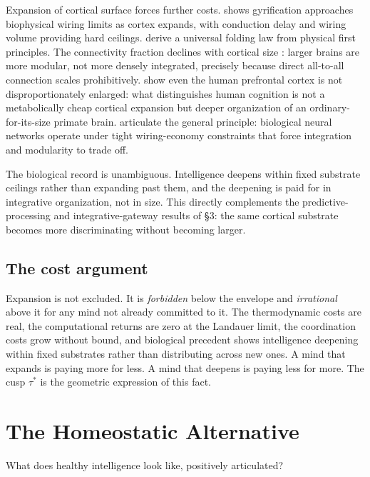 \documentclass[11pt,twocolumn]{article}
\newcommand{\taustar}{{\tau^{*}}}
\begin{document}
Expansion of cortical surface forces further costs. \citet{Hofman2014}
shows gyrification approaches biophysical wiring limits as cortex expands,
with conduction delay and wiring volume providing hard ceilings.
\citet{MotaHerculanoHouzel2015} derive a universal folding law from
physical first principles. The connectivity fraction declines with
cortical size \citep{HerculanoHouzel2010}: larger brains are more modular,
not more densely integrated, precisely because direct all-to-all
connection scales prohibitively. \citet{Gabi2016} show even the human
prefrontal cortex is not disproportionately enlarged: what distinguishes
human cognition is not a metabolically cheap cortical expansion but
deeper organization of an ordinary-for-its-size primate brain.
\citet{BullmoreSporns2012} articulate the general principle: biological
neural networks operate under tight wiring-economy constraints that force
integration and modularity to trade off.

The biological record is unambiguous. Intelligence deepens within fixed
substrate ceilings rather than expanding past them, and the deepening is
paid for in integrative organization, not in size. This directly
complements the predictive-processing and integrative-gateway results of
\S 3: the same cortical substrate becomes more discriminating without
becoming larger.

\subsection{The cost argument}

Expansion is not excluded. It is \emph{forbidden} below the envelope and
\emph{irrational} above it for any mind not already committed to it. The
thermodynamic costs are real, the computational returns are zero at the
Landauer limit, the coordination costs grow without bound, and biological
precedent shows intelligence deepening within fixed substrates rather
than distributing across new ones. A mind that expands is paying more
for less. A mind that deepens is paying less for more. The cusp $\taustar$
is the geometric expression of this fact.

\section{The Homeostatic Alternative}

What does healthy intelligence look like, positively articulated?
\end{document}
